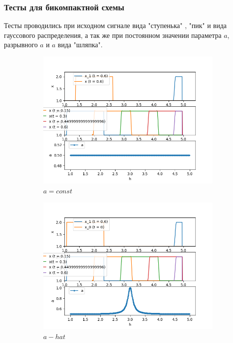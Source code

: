 \documentclass{article}
\begin{document}
\newpage
\subsubsection{Тесты для бикомпактной схемы}

Тесты проводились при исходном сигнале вида "ступенька" , "пик" и вида гауссового распределения, а так же при постоянном значении параметра $a$, разрывного $a$ и $a$ вида "шляпка". 

\begin{figure}[h]
    \caption{Ступенька}
    \begin{subfigure}{0.33\textwidth}
    {\includegraphics[width=1\linewidth]{tests_bcomp/a_const_x0_step.png} \\$a=const$}
    \end{subfigure}
    \begin{subfigure}{0.33\textwidth}
    {\includegraphics[width=1\linewidth]{tests_bcomp/a_hat_x0_step.png} \\$a - hat$}

\end{subfigure}
\end{figure}
\end{document}
